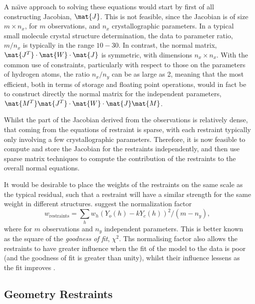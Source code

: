 \documentclass[pdf]{iucr}
\begin{document}
A na\"{\i}ve approach to solving these equations would start by first of all constructing Jacobian, $\mat{J}$. This is not feasible, since the Jacobian is of size $m \times n_x$, for $m$ observations, and $n_x$ crystallographic parameters. In a typical small molecule crystal structure determination, the data to parameter ratio, $m / n_x$ is typically in the range $10-30$. In contrast, the normal matrix, $\mat{J^T} \cdot \mat{W} \cdot \mat{J}$ is symmetric, with dimensions $n_x \times n_x$. With the common use of constraints, particularly with respect to those on the parameters of hydrogen atoms, the ratio $n_x/n_y$ can be as large as 2, meaning that the most efficient, both in terms of storage and floating point operations, would in fact be to construct directly the normal matrix for the independent parameters, $\mat{M^T} \mat{J^T} \cdot \mat{W} \cdot \mat{J} \mat{M}$.

Whilst the part of the Jacobian derived from the observations is relatively dense, that coming from the equations of restraint is sparse, with each restraint typically
only involving a few crystallographic parameters. Therefore, it is now feasible to compute and store the Jacobian for the restraints independently, and then use sparse matrix techniques to compute the contribution of the restraints to the overall normal equations.

It would be desirable to place the weights of the restraints on the same scale as the typical residual, such that a restraint will have a similar strength for the same weight in different structures. \cite{Giacovazzo:2002} suggest the normalization factor
\begin{equation}
w_\text{restraints} = \sum_{h}{ w_h (Y_o(h) - k Y_c(h))^2} / \left(m - n_y \right)
\label{eq:giacovazzo_normalisation},
\end{equation}
where for $m$ observations and $n_y$ independent parameters. This is better known as the square of the \emph{goodness of fit}, $\chi^2$. Ths normalising factor also allows the restraints to have greater influence when the fit of the model to the data is poor (and the goodness of fit is greater than unity), whilst their influence lessens as the fit improves \cite{SHELX:man97}.


\subsection{Geometry Restraints}
\end{document}
